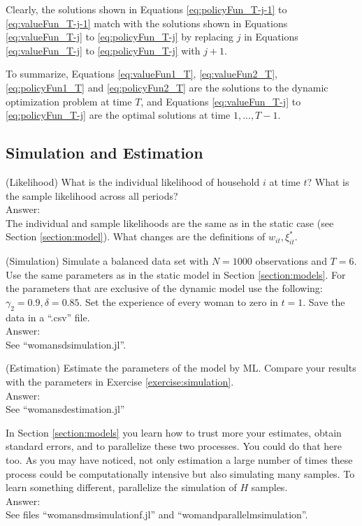 \indent Clearly, the solutions shown in Equations \eqref{eq:policyFun_T-j-1} to \eqref{eq:valueFun_T-j-1} match with the solutions shown in Equations \eqref{eq:valueFun_T-j} to \eqref{eq:policyFun_T-j} by replacing $j$ in Equations \eqref{eq:valueFun_T-j} to \eqref{eq:policyFun_T-j}  with $j + 1$.   

\indent To summarize, Equations \eqref{eq:valueFun1_T}, \eqref{eq:valueFun2_T}, \eqref{eq:policyFun1_T} and \eqref{eq:policyFun2_T} are the solutions to the dynamic optimization problem at time $T$, and Equations \eqref{eq:valueFun_T-j} to \eqref{eq:policyFun_T-j} are the optimal solutions at time $1, ..., T-1$.

\subsection{Simulation and Estimation}

\begin{exercise} (Likelihood)
What is the individual likelihood of household $i$ at time $t$? What is the sample likelihood across all periods?\\
\noindent Answer:\\
\noindent The individual and sample likelihoods are the same as in the static case (see Section \ref{section:model}). What changes are the definitions of $w_{it}, \xi_{it}^*$.
\end{exercise}

\begin{exercise} (Simulation) \label{exercise:simulation}
Simulate a balanced data set with $N = 1000$ observations and $T=6$. Use the same parameters as in the static model in Section \ref{section:models}. For the parameters that are exclusive of the dynamic model use the following: $\gamma_2 = 0.9,\delta = 0.85$. Set the experience of every woman to zero in $t=1$. Save the data in a ``.csv'' file.\\
\noindent Answer:\\
See ``womansdsimulation.jl''.
\end{exercise}

\begin{exercise} (Estimation)
Estimate the parameters of the model by ML. Compare your results with the parameters in Exercise \ref{exercise:simulation}.\\
\noindent Answer:\\
See ``womansdestimation.jl''
\end{exercise}

\begin{exercise}
In Section \ref{section:models} you learn how to trust more your estimates, obtain standard errors, and to parallelize these two processes. You could do that here too. As you may have noticed, not only estimation a large number of times these process could be computationally intensive but also simulating many samples. To learn something different, parallelize the simulation of $H$ samples.\\
\noindent Answer:\\
See files ``womansdmsimulationf.jl'' and ``womandparallelmsimulation''.
\end{exercise}
